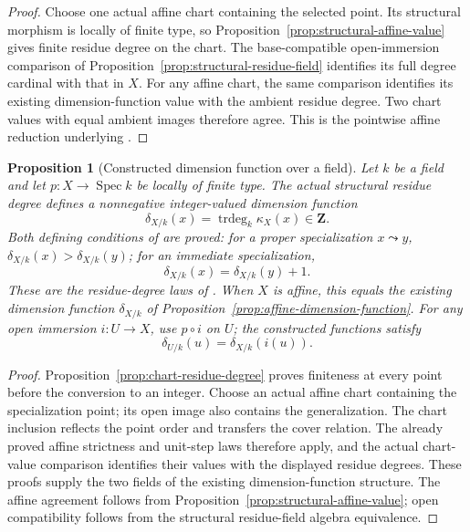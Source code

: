 \documentclass[11pt]{article}
\newtheorem{proposition}[theorem]{Proposition}
\theoremstyle{definition}
\theoremstyle{remark}
\DeclareMathOperator{\Spec}{Spec}
\begin{document}
\begin{proof}
Choose one actual affine chart containing the selected point. Its
structural morphism is locally of finite type, so
Proposition~\ref{prop:structural-affine-value} gives finite residue
degree on the chart. The base-compatible open-immersion comparison of
Proposition~\ref{prop:structural-residue-field} identifies its full
degree cardinal with that in \(X\).
For any affine chart, the same comparison identifies its existing
dimension-function value with the ambient residue degree. Two chart
values with equal ambient images therefore agree. This is the
pointwise affine reduction underlying
\cite{StacksAlgebraicSchemeDimension}.
\end{proof}

\begin{proposition}[Constructed dimension function over a field]
\label{prop:global-field-dimension-function}
Let \(k\) be a field and let \(p:X\to\Spec k\) be locally of
finite type. The actual structural residue degree defines a nonnegative
integer-valued dimension function
\[
  \delta_{X/k}(x)=\operatorname{trdeg}_k\kappa_X(x)\in\mathbf Z.
\]
Both defining conditions of \cite{StacksDimensionFunction} are proved:
for a proper specialization \(x\leadsto y\),
\(\delta_{X/k}(x)>\delta_{X/k}(y)\); for an immediate specialization,
\[
  \delta_{X/k}(x)=\delta_{X/k}(y)+1.
\]
These are the residue-degree laws of \cite{StacksAlgebraicSchemeDimension}.
When \(X\) is affine, this equals the existing dimension function
\(\delta_{X/k}\) of Proposition~\ref{prop:affine-dimension-function}.
For any open immersion \(i:U\to X\), use \(p\circ i\) on \(U\);
the constructed functions satisfy
\[
  \delta_{U/k}(u)=\delta_{X/k}(i(u)).
\]
\end{proposition}

\begin{proof}
Proposition~\ref{prop:chart-residue-degree} proves finiteness at every
point before the conversion to an integer. Choose an actual affine
chart containing the specialization point; its open image also contains
the generalization. The chart inclusion reflects the point order and
transfers the cover relation. The already proved affine strictness and
unit-step laws therefore apply, and the actual chart-value comparison
identifies their values with the displayed residue degrees.
These proofs supply the two fields of the existing dimension-function
structure. The affine agreement follows from
Proposition~\ref{prop:structural-affine-value}; open compatibility
follows from the structural residue-field algebra equivalence.
\end{proof}
\end{document}
